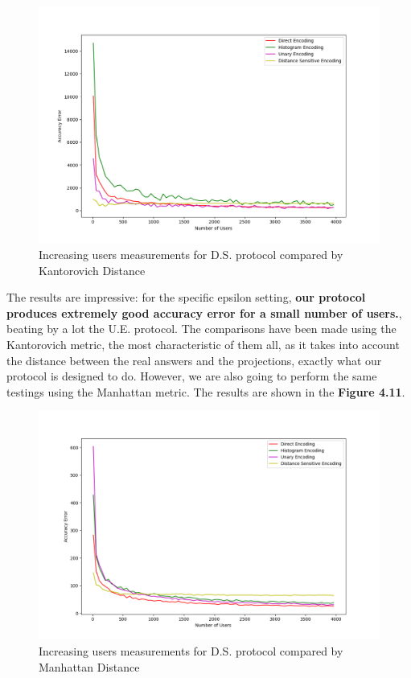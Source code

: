 \begin{figure}[!htb]\centering
    \includegraphics[width=1\textwidth]{images/users_our_kant.png}
    \caption{Increasing users measurements for D.S. protocol compared by Kantorovich Distance}
\end{figure}

The results are impressive: for the specific epsilon setting, \textbf{our protocol produces extremely good accuracy error for a small number of users.}, beating by a lot the U.E. protocol. The comparisons have been made using the Kantorovich metric, the most characteristic of them all, as it takes into account the distance between the real answers and the projections, exactly what our protocol is designed to do. However, we are also going to perform the same testings using the Manhattan metric. The results are shown in the \textbf{Figure 4.11}.

\begin{figure}[!htb]\centering
    \includegraphics[width=1\textwidth]{images/users_our_l1.png}
    \caption{Increasing users measurements for D.S. protocol compared by Manhattan Distance}
\end{figure}

